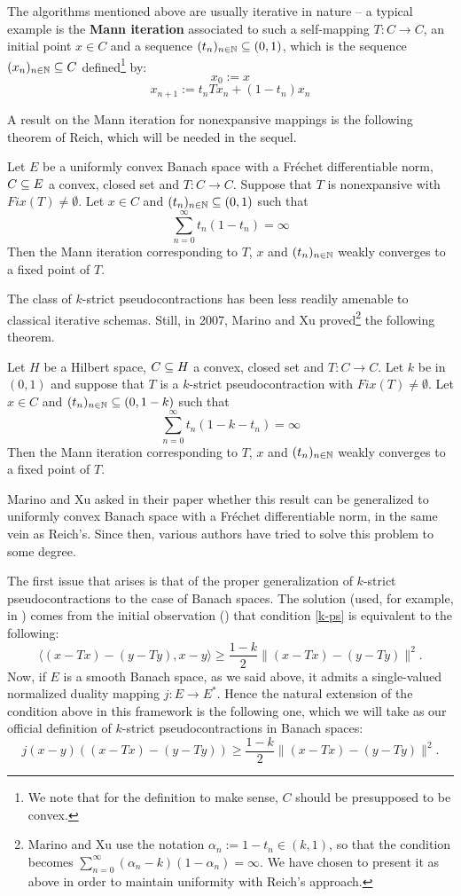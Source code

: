 \documentclass{article}
\begin{document}
The algorithms mentioned above are usually iterative in nature -- a typical example is the {\bf Mann iteration} associated to such a self-mapping $T: C \to C$, an initial point $x \in C$ and a sequence $(t_n)_{n \in {\mathbb N}} \subseteq (0,1)$, which is the sequence $(x_n)_{n \in {\mathbb N}} \subseteq C$ defined\footnote{We note that for the definition to make sense, $C$ should be presupposed to be convex.} by:
$$x_0:=x$$
$$x_{n+1}:=t_n Tx_n + (1-t_n) x_n$$

A result on the Mann iteration for nonexpansive mappings is the following theorem of Reich, which will be needed in the sequel.

\label{reich}
Let $E$ be a uniformly convex Banach space with a Fréchet differentiable norm, $C \subseteq E$ a convex, closed set and $T:C \to C$. Suppose that $T$ is nonexpansive with $Fix(T)\neq\emptyset$. Let $x \in C$ and $(t_n)_{n \in {\mathbb N}} \subseteq (0,1)$ such that
$$\sum_{n=0}^\infty t_n(1-t_n) = \infty$$
Then the Mann iteration corresponding to $T$, $x$ and $(t_n)_{n \in {\mathbb N}}$ weakly converges to a fixed point of $T$.
\ethm

The class of $k$-strict pseudocontractions has been less readily amenable to classical iterative schemas. Still, in 2007, Marino and Xu proved\footnote{Marino and Xu use the notation $\alpha_n:=1-t_n \in (k,1)$, so that the condition becomes $\sum_{n=0}^\infty (\alpha_n-k)(1-\alpha_n) = \infty$. We have chosen to present it as above in order to maintain uniformity with Reich's approach.} the following theorem.

\label{marxu}
Let $H$ be a Hilbert space, $C\subseteq H$ a convex, closed set and $T: C \to C$. Let $k$ be in $(0,1)$ and suppose that $T$ is a $k$-strict pseudocontraction with $Fix(T)\neq\emptyset$. Let $x \in C$ and $(t_n)_{n \in {\mathbb N}} \subseteq (0,1-k)$ such that
$$\sum_{n=0}^\infty t_n(1-k-t_n) = \infty$$
Then the Mann iteration corresponding to $T$, $x$ and $(t_n)_{n \in {\mathbb N}}$ weakly converges to a fixed point of $T$.
\ethm

Marino and Xu asked in their paper whether this result can be generalized to uniformly convex Banach space with a Fréchet differentiable norm, in the same vein as Reich's. Since then, various authors have tried to solve this problem to some degree.

The first issue that arises is that of the proper generalization of $k$-strict pseudocontractions to the case of Banach spaces. The solution (used, for example, in \cite{ChoSua13,Zho14}) comes from the initial observation (\cite[Theorem 1.(2)]{BroPet67}) that condition \eqref{k-ps} is equivalent to the following:
$$\langle (x-Tx)-(y-Ty), x-y \rangle \geq \frac{1-k}{2} \|(x-Tx) - (y-Ty)\|^2.$$
Now, if $E$ is a smooth Banach space, as we said above, it admits a single-valued normalized duality mapping $j: E \to E^*$. Hence the natural extension of the condition above in this framework is the following one, which we will take as our official definition of $k$-strict pseudocontractions in Banach spaces:
$$j(x-y)((x-Tx)-(y-Ty)) \geq \frac{1-k}{2} \|(x-Tx) - (y-Ty)\|^2.$$
\end{document}
